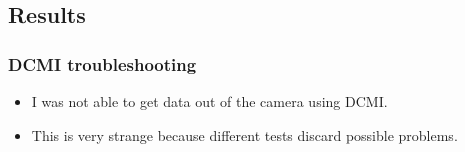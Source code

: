 \subsection{Results}

\subsubsection{DCMI troubleshooting}
\begin{itemize}
	\item I was not able to get data out of the camera using DCMI.
	\item This is very strange because different tests discard possible problems.
\end{itemize}
